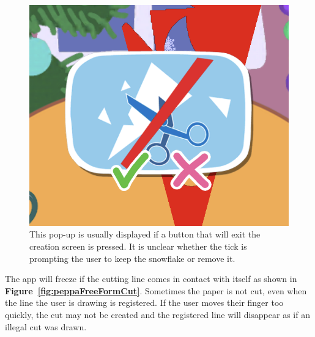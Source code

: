 \documentclass[11pt]{article}
\begin{document}
\begin{figure}[!ht]
                        \begin{minipage}{0.32\textwidth}
                            \centering
                            \includegraphics[width=0.8\linewidth]{Images/peppa/peppaPopUp}
                             \caption{This pop-up is usually displayed if a button that will exit the creation screen is pressed. It is unclear whether the tick is prompting the user to keep the snowflake or remove it.}
                            \label{fig:peppaPopUp}
                        \end{minipage}
                    \end{figure}
                    
                    The app will freeze if the cutting line comes in contact with itself as shown in \textbf{Figure~\ref{fig:peppaFreeFormCut}}. Sometimes the paper is not cut, even when the line the user is drawing is registered. If the user moves their finger too quickly, the cut may not be created and the registered line will disappear as if an illegal cut was drawn.
                    
\end{document}
